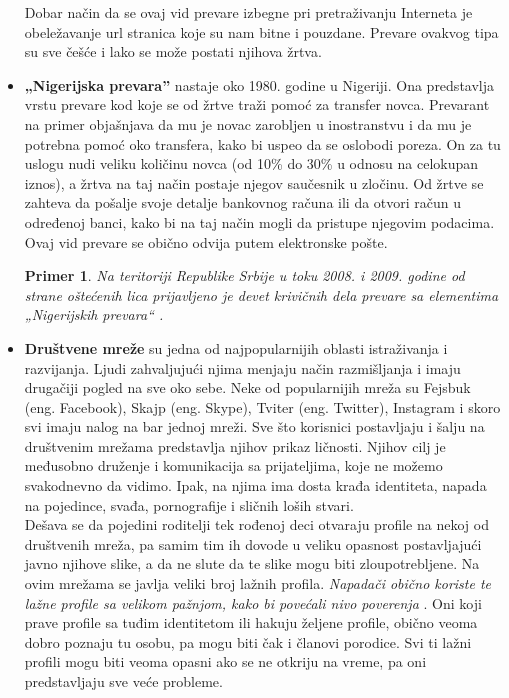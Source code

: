 \documentclass[a4paper]{article}
\newtheorem{primer}{Primer}[section]
\begin{document}
\begin{itemize}
Dobar način da se ovaj vid prevare izbegne pri pretraživanju Interneta je obeležavanje url stranica koje su nam bitne i pouzdane. Prevare ovakvog tipa su sve češće i lako se može postati njihova žrtva.
\item \textbf{„Nigerijska prevara”} nastaje oko 1980. godine u Nigeriji. Ona predstavlja vrstu prevare kod koje se od žrtve traži pomoć za transfer novca. Prevarant na primer objašnjava da mu je novac zarobljen u inostranstvu i da mu je potrebna pomoć oko transfera, kako bi uspeo da se oslobodi poreza. On za tu uslogu nudi veliku količinu novca (od 10\% do 30\% u odnosu na celokupan iznos), a žrtva na taj način postaje njegov saučesnik u zločinu. Od žrtve se zahteva da pošalje svoje detalje bankovnog računa ili da otvori račun u određenoj banci, kako bi na taj način mogli da pristupe njegovim podacima. Ovaj vid prevare se obično odvija putem elektronske pošte. 
\begin{primer}
Na teritoriji Republike Srbije u toku 2008. i 2009. godine od strane oštećenih lica prijavljeno je devet krivičnih dela prevare sa elementima „Nigerijskih prevara“ \cite{nig}.
\end{primer}
\item\textbf{Društvene mreže} su jedna od najpopularnijih oblasti istraživanja i razvijanja. Ljudi zahvaljujući njima menjaju način razmišljanja i imaju drugačiji pogled na sve oko sebe. Neke od popularnijih mreža su Fejsbuk (eng. Facebook), Skajp (eng. Skype), Tviter (eng. Twitter), Instagram i skoro svi imaju nalog na bar jednoj mreži. Sve što korisnici postavljaju i šalju na društvenim mrežama predstavlja njihov prikaz ličnosti. Njihov cilj je međusobno druženje i komunikacija sa prijateljima, koje ne možemo svakodnevno da vidimo. Ipak, na njima ima dosta krađa identiteta, napada na pojedince, svađa, pornografije i sličnih loših stvari.\\Dešava se da pojedini roditelji tek rođenoj deci otvaraju profile na nekoj od društvenih mreža, pa samim tim ih dovode u veliku opasnost postavljajući javno njihove slike, a da ne slute da te slike mogu biti zloupotrebljene. Na ovim mrežama se javlja veliki broj lažnih profila.
{\em Napadači obično koriste te lažne profile sa velikom pažnjom, kako bi povećali nivo poverenja} \cite{fakePr}.
Oni koji prave profile sa tuđim identitetom ili hakuju željene profile, obično veoma dobro poznaju tu osobu, pa  mogu biti čak i članovi porodice. Svi ti lažni profili mogu biti veoma opasni ako se ne otkriju na vreme, pa oni predstavljaju sve veće probleme.
\end{itemize}
\end{document}
